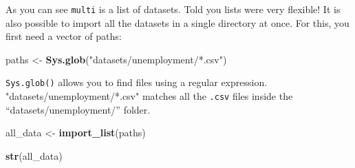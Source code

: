 \documentclass[
]{article}
\newenvironment{Shaded}{\begin{snugshade}}{\end{snugshade}}
\newcommand{\KeywordTok}[1]{\textcolor[rgb]{0.13,0.29,0.53}{\textbf{#1}}}
\newcommand{\NormalTok}[1]{#1}
\newcommand{\StringTok}[1]{\textcolor[rgb]{0.31,0.60,0.02}{#1}}
\begin{document}
As you can see \texttt{multi} is a list of datasets. Told you lists were very flexible! It is also possible
to import all the datasets in a single directory at once. For this, you first need a vector of paths:

\begin{Shaded}
\begin{Highlighting}[]
\NormalTok{paths \textless{}{-}}\StringTok{ }\KeywordTok{Sys.glob}\NormalTok{(}\StringTok{"datasets/unemployment/*.csv"}\NormalTok{)}
\end{Highlighting}
\end{Shaded}

\texttt{Sys.glob()} allows you to find files using a regular expression. "datasets/unemployment/*.csv"
matches all the \texttt{.csv} files inside the ``datasets/unemployment/'' folder.

\begin{Shaded}
\begin{Highlighting}[]
\NormalTok{all\_data \textless{}{-}}\StringTok{ }\KeywordTok{import\_list}\NormalTok{(paths)}

\KeywordTok{str}\NormalTok{(all\_data)}
\end{Highlighting}
\end{Shaded}
\end{document}
